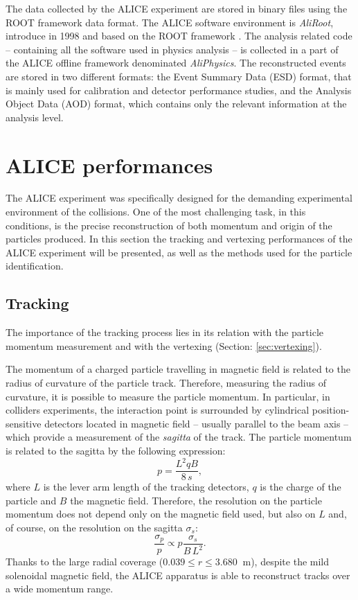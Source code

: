 The data collected by the ALICE experiment are stored in binary files using the ROOT framework data 
format.
The ALICE software environment is \textit{AliRoot}, introduce in 1998 and based on the ROOT framework
\cite{root}.
The analysis related code -- containing all the software used in physics analysis -- is collected
in a part of the ALICE offline framework denominated \textit{AliPhysics}.
The reconstructed events are stored in two different formats: the Event Summary Data (ESD) format, 
that is mainly used for calibration and detector performance studies, and the Analysis Object Data 
(AOD) format, which contains only the relevant information at the analysis level.

%
%
\section{ALICE performances} \label{sec:ali_perf}

The ALICE experiment was specifically designed for the demanding experimental environment of the 
\PbPb collisions. 
One of the most challenging task, in this conditions, is the precise reconstruction of both momentum
and origin of the particles produced.
In this section the tracking and vertexing performances of the ALICE experiment will be presented,
as well as the methods used for the particle identification.

%
\subsection{Tracking} \label{sec:tarcking}

The importance of the tracking process lies in its relation with the particle momentum
measurement and with the vertexing (Section: \ref{sec:vertexing}).

The momentum of a charged particle travelling in magnetic field is related to the radius of curvature
of the particle track. Therefore, measuring the radius of curvature, it is possible to measure the
particle momentum.
In particular, in colliders experiments, the interaction point is surrounded by cylindrical 
position-sensitive detectors located in magnetic field -- usually parallel to the beam axis -- 
which provide a measurement of the \textit{sagitta} of the track.
The particle momentum is related to the sagitta by the following expression:
\begin{equation}
    p = \frac{L^{2} q B}{8\,s},
\end{equation}
where $L$ is the lever arm length of the tracking detectors, $q$ is the charge of the particle and $B$
the magnetic field.
Therefore, the resolution on the particle momentum does not depend only on the magnetic field used,
but also on $L$ and, of course, on the resolution on the sagitta $\sigma_{s}$:
\begin{equation}
    \frac{\sigma_{p}}{p} \propto p \frac{\sigma_{s}}{B\,L^{2}}.
\end{equation}
Thanks to the large radial coverage ($0.039 \leq r \leq 3.680\ $ m), despite the mild solenoidal
magnetic field, the ALICE apparatus is able to reconstruct tracks over a wide momentum range.

